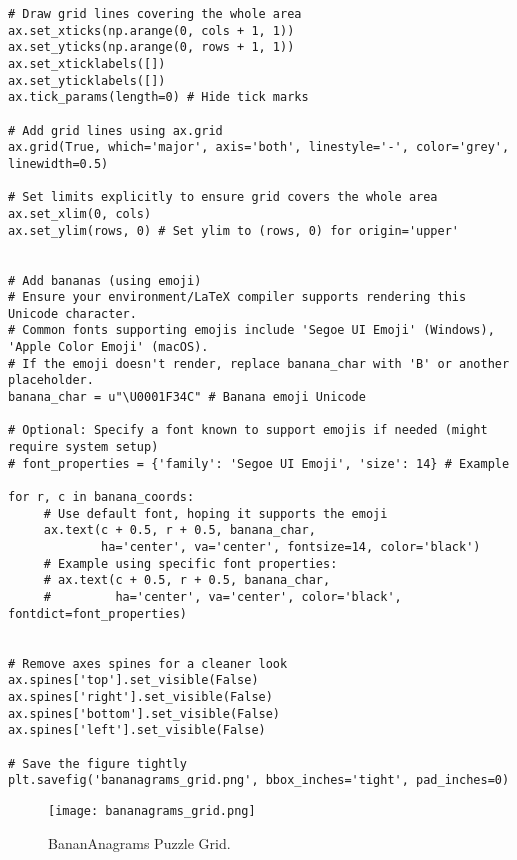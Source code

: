 \documentclass[11pt]{article}
\begin{document}
\begin{verbatim}
# Draw grid lines covering the whole area
ax.set_xticks(np.arange(0, cols + 1, 1))
ax.set_yticks(np.arange(0, rows + 1, 1))
ax.set_xticklabels([])
ax.set_yticklabels([])
ax.tick_params(length=0) # Hide tick marks

# Add grid lines using ax.grid
ax.grid(True, which='major', axis='both', linestyle='-', color='grey', linewidth=0.5)

# Set limits explicitly to ensure grid covers the whole area
ax.set_xlim(0, cols)
ax.set_ylim(rows, 0) # Set ylim to (rows, 0) for origin='upper'


# Add bananas (using emoji)
# Ensure your environment/LaTeX compiler supports rendering this Unicode character.
# Common fonts supporting emojis include 'Segoe UI Emoji' (Windows), 'Apple Color Emoji' (macOS).
# If the emoji doesn't render, replace banana_char with 'B' or another placeholder.
banana_char = u"\U0001F34C" # Banana emoji Unicode

# Optional: Specify a font known to support emojis if needed (might require system setup)
# font_properties = {'family': 'Segoe UI Emoji', 'size': 14} # Example

for r, c in banana_coords:
     # Use default font, hoping it supports the emoji
     ax.text(c + 0.5, r + 0.5, banana_char,
             ha='center', va='center', fontsize=14, color='black')
     # Example using specific font properties:
     # ax.text(c + 0.5, r + 0.5, banana_char,
     #         ha='center', va='center', color='black', fontdict=font_properties)


# Remove axes spines for a cleaner look
ax.spines['top'].set_visible(False)
ax.spines['right'].set_visible(False)
ax.spines['bottom'].set_visible(False)
ax.spines['left'].set_visible(False)

# Save the figure tightly
plt.savefig('bananagrams_grid.png', bbox_inches='tight', pad_inches=0)

\end{verbatim}

\begin{figure}[H] %
\centering
\texttt{[image: bananagrams\_grid.png]}
\caption{BananAnagrams Puzzle Grid.}
\label{fig:bananagrams_grid}
\end{figure}
\end{document}
